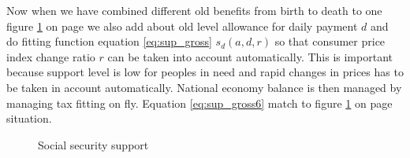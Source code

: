 Now when we have combined different old benefits from birth to death to one figure \ref{fig:Support} on page \pageref{fig:Support} we also add about old level allowance for daily payment $d$ and do fitting function equation \ref{eq:sup_gross} $s_d(a,d,r)$ so that consumer price index change ratio $r$ can be taken into account automatically. This is important because support level is low for peoples in need and rapid changes in prices has to be taken in account automatically. National economy balance is then managed by managing tax fitting on fly. Equation \ref{eq:sup_gross6} match to figure \ref{fig:Support} on page \pageref{fig:Support} situation.
\begin{figure} %
 \begin{center}
  \caption{Social security support}
  \label{fig:Support} 
 \end{center}
\end{figure}
\begin{comment}
\end{comment}
